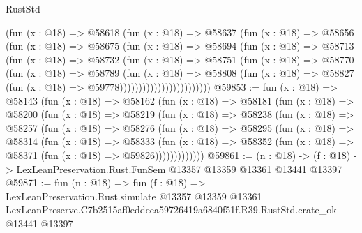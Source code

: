 \begin{lexlean}{RustStd}
\begin{coremodule}
                          (fun (x : @18) =>
                          @58618
                            (fun (x : @18) =>
                            @58637
                              (fun (x : @18) =>
                              @58656
                                (fun (x : @18) =>
                                @58675
                                  (fun (x : @18) =>
                                  @58694
                                    (fun (x : @18) =>
                                    @58713
                                      (fun (x : @18) =>
                                      @58732
                                        (fun (x : @18) =>
                                        @58751
                                          (fun (x : @18) =>
                                          @58770
                                            (fun (x : @18) =>
                                            @58789
                                              (fun (x : @18) =>
                                              @58808
                                                (fun (x : @18) =>
                                                @58827
                                                  (fun (x : @18) => @59778))))))))))))))))))))))))
@59853 := fun (x : @18) =>
  @58143
    (fun (x : @18) =>
    @58162
      (fun (x : @18) =>
      @58181
        (fun (x : @18) =>
        @58200
          (fun (x : @18) =>
          @58219
            (fun (x : @18) =>
            @58238
              (fun (x : @18) =>
              @58257
                (fun (x : @18) =>
                @58276
                  (fun (x : @18) =>
                  @58295
                    (fun (x : @18) =>
                    @58314
                      (fun (x : @18) =>
                      @58333
                        (fun (x : @18) =>
                        @58352 (fun (x : @18) => @58371 (fun (x : @18) => @59826)))))))))))))
@59861 := (n : @18) ->
  (f : @18) -> LexLeanPreservation.Rust.FunSem @13357 @13359 @13361 @13441 @13397
@59871 := fun (n : @18) =>
  fun (f : @18) =>
  LexLeanPreservation.Rust.simulate
    @13357
    @13359
    @13361
    LexLeanPreserve.C7b2515af0eddeea59726419a6840f51f.R39.RustStd.crate_ok
    @13441
    @13397
\end{coremodule}
\end{lexlean}
